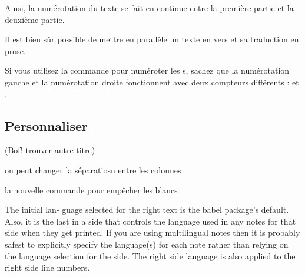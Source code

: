 Ainsi, la numérotation du texte se fait en continue entre la première partie et la deuxième partie.


\begin{plusloins}
Il est bien sûr possible de mettre en parallèle un texte en vers et sa traduction en prose. 

Si vous utilisez la commande  pour numéroter les s, sachez que la numérotation gauche et la numérotation droite fonctionnent avec deux compteurs différents :  et .
\end{plusloins}




\subsection{Personnaliser}


(Bof! trouver autre titre)



on peut changer la séparatiosn entre les colonnes

la nouvelle commande pour empêcher les blancs


The initial lan- guage selected for the right text is the babel package’s default. Also, it is the last \selectlanguage in a side that controls the language used in any notes for that
side when they get printed. If you are using multilingual notes then it is probably safest to explicitly specify the language(s) for each note rather than relying on the language selection for the side. The right side language is also applied to the right side line numbers.
